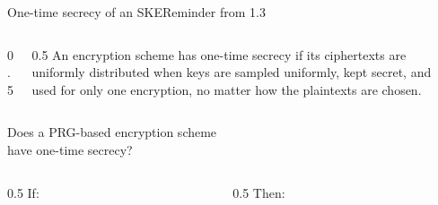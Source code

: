 \ifdefined\PRESENTATION\else\PassOptionsToClass{handout}{beamer}\fi\documentclass[aspectratio=169, lualatex]{beamer}
\begin{document}
\begin{frame}{One-time secrecy of an SKE}{Reminder from 1.3}
	\begin{columns}[c]
		\begin{column}{0.5\textwidth}
		\end{column}
		\begin{column}{0.5\textwidth}
			An encryption scheme has one-time secrecy if its ciphertexts are uniformly distributed when keys are sampled uniformly, kept secret, and used for only one encryption, no matter how the plaintexts are chosen.
		\end{column}
	\end{columns}
\end{frame}

\begin{frame}{Does a PRG-based encryption scheme\\ have one-time secrecy?}
	\begin{columns}[c]
		\begin{column}{0.5\textwidth}
			If:
		\end{column}
		\pause
		\begin{column}{0.5\textwidth}
			Then:
		\end{column}
	\end{columns}
\end{frame}
\end{document}
